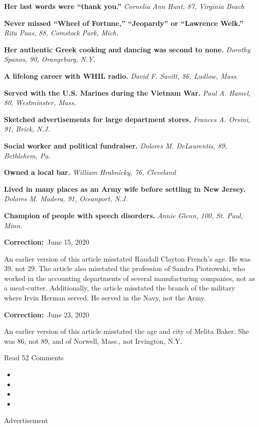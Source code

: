 \textbf{Her last words were ``thank you.''} \emph{Cornelia Ann Hunt, 87,
Virginia Beach}

\textbf{Never missed ``Wheel of Fortune,'' ``Jeopardy'' or ``Lawrence
Welk.''} \emph{Rita Paas, 88, Comstock Park, Mich.}

\textbf{Her authentic Greek cooking and dancing was second to none.}
\emph{Dorothy Spanos, 90, Orangeburg, N.Y.}

\textbf{A lifelong career with WHIL radio.} \emph{David F. Savitt, 86,
Ludlow, Mass.}

\textbf{Served with the U.S. Marines during the Vietnam War.} \emph{Paul
A. Hamel, 80, Westminster, Mass.}

\textbf{Sketched advertisements for large department stores.}
\emph{Frances A. Orsini, 91, Brick, N.J.}

\textbf{Social worker and political fundraiser.} \emph{Dolores M.
DeLaurentis, 89, Bethlehem, Pa.}

\textbf{Owned a local bar.} \emph{William Hrabnicky, 76, Cleveland}

\textbf{Lived in many places as an Army wife before settling in New
Jersey.} \emph{Dolores M. Madera, 91, Oceanport, N.J.}

\textbf{Champion of people with speech disorders.} \emph{Annie Glenn,
100, St. Paul, Minn.}

\textbf{Correction:}~June 15, 2020

An earlier version of this article misstated Randall Clayton French's
age. He was 39, not 29. The article also misstated the profession of
Sandra Piotrowski, who worked in the accounting departments of several
manufacturing companies, not as a meat-cutter. Additionally, the article
misstated the branch of the military where Irvin Herman served. He
served in the Navy, not the Army.

\textbf{Correction:}~June 23, 2020

An earlier version of this article misstated the age and city of Melita
Baker. She was 86, not 89, and of Norwell, Mass., not Irvington, N.Y.

Read 52 Comments

\begin{itemize}
\item
\item
\item
\item
\end{itemize}

Advertisement

